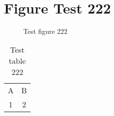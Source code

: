 \documentclass{article}
\begin{document}
\section{Figure Test 222}
\begin{figure}[h]
\caption{Test figure 222}
\end{figure}
\begin{table}[h]
\caption{Test table 222}
\begin{tabular}{cc}
A & B \\
1 & 2
\end{tabular}
\end{table}
\end{document}

